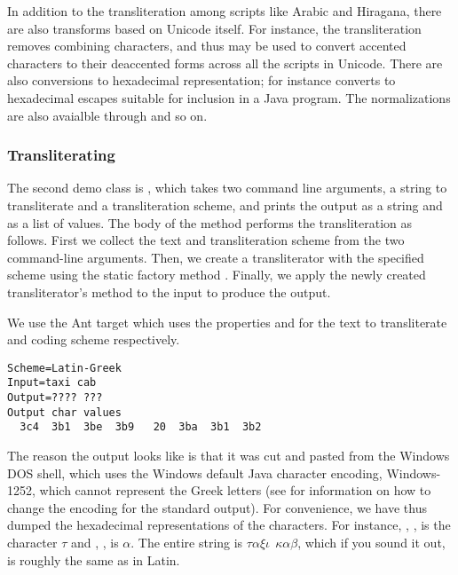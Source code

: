 In addition to the transliteration among scripts like Arabic and
Hiragana, there are also transforms based on Unicode itself.  For
instance, the  transliteration removes combining
characters, and thus may be used to convert accented characters to
their deaccented forms across all the scripts in Unicode.  There
are also conversions to hexadecimal representation; for instance
 converts to hexadecimal  escapes
suitable for inclusion in a Java program.  The normalizations are
also avaialble through  and so on. 

\subsubsection{Transliterating}

The second demo class is , which takes two command
line arguments, a string to transliterate and a transliteration
scheme, and prints the output as a string and as a list of 
values.  The body of the  method performs the
transliteration as follows.
%
%
First we collect the text and transliteration scheme from the two
command-line arguments.  Then, we create a transliterator with the
specified scheme using the static factory method .
Finally, we apply the newly created transliterator's
 method to the input to produce the output.

We use the Ant target  which uses the properties
 and  for the text to transliterate and coding
scheme respectively.  
%
\begin{verbatim}
Scheme=Latin-Greek
Input=taxi cab
Output=???? ???
Output char values
  3c4  3b1  3be  3b9   20  3ba  3b1  3b2
\end{verbatim}
%
The reason the output looks like  is that it was cut
and pasted from the Windows DOS shell, which uses the Windows default
Java character encoding, Windows-1252, which cannot represent the
Greek letters (see  for information on how to
change the encoding for the standard output).  For convenience, we
have thus dumped the hexadecimal representations of the characters.
For instance, ,
, is the 
character $\tau$ and , , is $\alpha$.  The entire string is $\tau\alpha\xi\iota \ \
\kappa\alpha\beta$, which if you sound it out, is roughly
the same as  in Latin.

